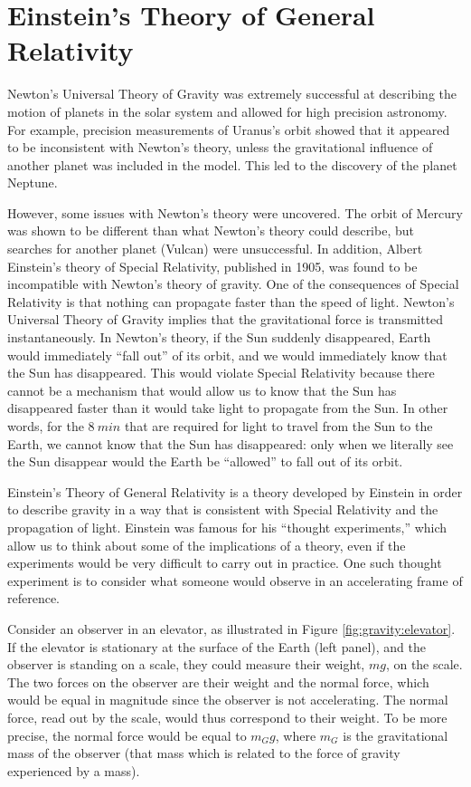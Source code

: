 \section{Einstein's Theory of General Relativity}
Newton's Universal Theory of Gravity was extremely successful at describing the motion of planets in the solar system and allowed for high precision astronomy. For example, precision measurements of  Uranus's orbit showed that it appeared to be inconsistent with Newton's theory, unless the gravitational influence of another planet was included in the model. This led to the discovery of the planet Neptune. 

However, some issues with Newton's theory were uncovered. The orbit of Mercury was shown to be different than what Newton's theory could describe, but searches for another planet (Vulcan) were unsuccessful. In addition, Albert Einstein's theory of Special Relativity, published in 1905, was found to be incompatible with Newton's theory of gravity. One of the consequences of Special Relativity is that nothing can propagate faster than the speed of light. Newton's Universal Theory of Gravity implies that the gravitational force is transmitted instantaneously. In Newton's theory, if the Sun suddenly disappeared, Earth would immediately ``fall out'' of its orbit, and we would immediately know that the Sun has disappeared. This would violate Special Relativity because there cannot be a mechanism that would allow us to know that the Sun has disappeared faster than it would take light to propagate from the Sun. In other words, for the $\SI{8}{min}$ that are required for light to travel from the Sun to the Earth, we cannot know that the Sun has disappeared: only when we literally see the Sun disappear would the Earth be ``allowed'' to fall out of its orbit.

Einstein's Theory of General Relativity is a theory developed by Einstein in order to describe gravity in a way that is consistent with Special Relativity and the propagation of light. Einstein was famous for his ``thought experiments,'' which allow us to think about some of the implications of a theory, even if the experiments would be very difficult to carry out in practice. One such thought experiment is to consider what someone would observe in an accelerating frame of reference.

Consider an observer in an elevator, as illustrated in Figure \ref{fig:gravity:elevator}. If the elevator is stationary at the surface of the Earth (left panel), and the observer is standing on a scale, they could measure their weight, $mg$, on the scale. The two forces on the observer are their weight and the normal force, which would be equal in magnitude since the observer is not accelerating. The normal force, read out by the scale, would thus correspond to their weight. To be more precise, the normal force would be equal to $m_Gg$, where $m_G$ is the gravitational mass of the observer (that mass which is related to the force of gravity experienced by a mass).

